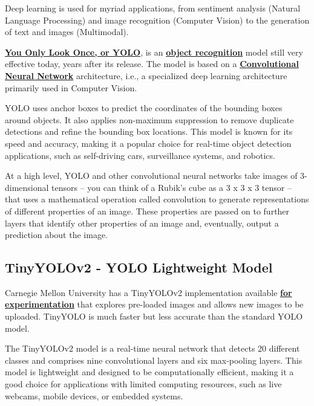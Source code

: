 Deep learning is used for myriad applications, from sentiment analysis (Natural Language Processing) and image recognition (Computer Vision) to the generation of text and images (Multimodal).

\href{https://arxiv.org/abs/1506.02640}{\textbf{You Only Look Once, or YOLO}}, is an \href{https://en.wikipedia.org/wiki/Object_detection}{\textbf{object recognition}} model still very effective today, years after its release. The model is based on a \href{https://stanford.edu/~shervine/teaching/cs-230/cheatsheet-convolutional-neural-networks}{\textbf{Convolutional Neural Network}} architecture, i.e., a specialized deep learning architecture primarily used in Computer Vision.

YOLO uses anchor boxes to predict the coordinates of the bounding boxes around objects. It also applies non-maximum suppression to remove duplicate detections and refine the bounding box locations. This model is known for its speed and accuracy, making it a popular choice for real-time object detection applications, such as self-driving cars, surveillance systems, and robotics.

At a high level, YOLO and other convolutional neural networks take images of 3-dimensional tensors -- you can think of a Rubik's cube as a 3 x 3 x 3 tensor -- that uses a mathematical operation called convolution to generate representations of different properties of an image. These properties are passed on to further layers that identify other properties of an image and, eventually, output a prediction about the image.

\subsection{TinyYOLOv2 - YOLO Lightweight Model}

Carnegie Mellon University has a TinyYOLOv2 implementation available \href{https://www.cs.cmu.edu/~dst/FaceDemo/index.html}{\textbf{for experimentation}} that explores pre-loaded images and allows new images to be uploaded. TinyYOLO is much faster but less accurate than the standard YOLO model.

The TinyYOLOv2 model is a real-time neural network that detects 20 different classes and comprises nine convolutional layers and six max-pooling layers. This model is lightweight and designed to be computationally efficient, making it a good choice for applications with limited computing resources, such as live webcams, mobile devices, or embedded systems.

